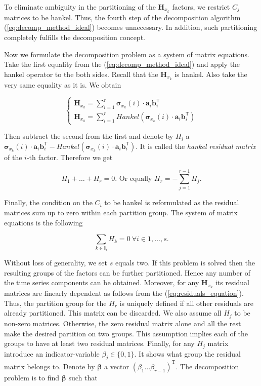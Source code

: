 \documentclass[referee, pdflatex, sn-mathphys-num]{sn-jnl}
\theoremstyle{definition}
\theoremstyle{plain}
\begin{document}
	To eliminate ambiguity in the partitioning of the $ \mathbf{H}_{x_k} $ factors, we restrict $ C_j $ matrices to be hankel. Thus, the fourth step of the decomposition algorithm (\ref{eq:decomp_method_ideal}) becomes unnecessary. In addition, such partitioning completely fulfills the decomposition concept. 
	
	Now we formulate the decomposition problem as a system of matrix equations. Take the first equality from the (\ref{eq:decomp_method_ideal}) and apply the hankel operator to the both sides. Recall that the $ \mathbf{H}_{x_k} $ is hankel. Also take the very same equality as it is. We obtain
	
	\begin{equation*}
		\begin{cases*}
			\mathbf{H}_{x_k} = \sum\limits_{i = 1}^{r} \boldsymbol{\sigma}_{x_k}(i) \cdot \mathbf{a}_i  \mathbf{b}_i^{\mathsf{T}} \\
			\mathbf{H}_{x_k} = \sum\limits_{i = 1}^{r} Hankel(\boldsymbol{\sigma}_{x_k}(i) \cdot \mathbf{a}_i  \mathbf{b}_i^{\mathsf{T}})
		\end{cases*}
	\end{equation*}
	
	Then subtract the second from the first and denote by $ H_i $ a $ \boldsymbol{\sigma}_{x_k}(i) \cdot \mathbf{a}_i  \mathbf{b}_i^{\mathsf{T}} - Hankel(\boldsymbol{\sigma}_{x_k}(i) \cdot \mathbf{a}_i  \mathbf{b}_i^{\mathsf{T}}) $. It is called the \emph{hankel residual matrix} of the $ i $-th factor. Therefore we get
	
	\begin{equation}\label{eq:residuals_equation}
		H_1 + \ldots + H_r = 0 \text{. Or equally } H_r = - \sum\limits_{j = 1}^{r - 1} H_j.
	\end{equation}
	
	Finally, the condition on the $ C_i $ to be hankel is reformulated as the residual matrices sum up to zero within each partition group. The system of matrix equations is the following
	
	\begin{equation*}
		\sum_{k \in \mathbb{I}_i} H_k = 0 \  \forall i \in 1, \ldots, s.
	\end{equation*}
	
	Without loss of generality, we set $ s $ equals two. If this problem is solved then the resulting groups of the factors can be further partitioned. Hence any number of the time series components can be obtained. Moreover, for any $ \mathbf{H}_{x_k} $ its residual matrices are linearly dependent as follows from the (\ref{eq:residuals_equation}). Thus, the partition group for the $ H_r $ is uniquely defined if all other residuals are already partitioned. This matrix can be discarded. We also assume all $ H_j $ to be non-zero matrices. Otherwise, the zero residual matrix alone and all the rest make the desired partition on two groups. This assumption implies each of the groups to have at least two residual matrices. Finally, for any $ H_j $ matrix introduce an indicator-variable $ \beta_j \in \{0, 1\} $. It shows what group the residual matrix belongs to. Denote by $ \boldsymbol{\beta} $ a vector $ (\beta_1 \ldots \beta_{r-1})^{\text{T}} $. The decomposition problem is to find $ \boldsymbol{\beta} $ such that
	
\end{document}
